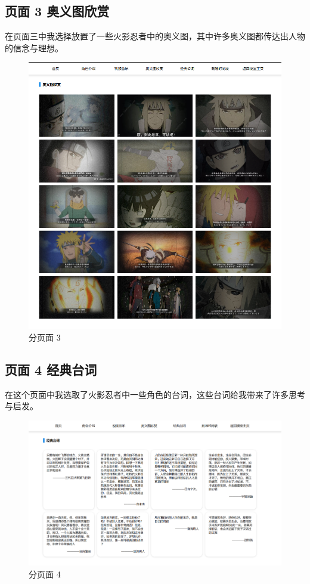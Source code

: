 \documentclass[supercite]{Experimental_Report}
\theoremstyle{definition}
\begin{document}
\newpage

\subsection{页面 3 奥义图欣赏}
在页面三中我选择放置了一些火影忍者中的奥义图，其中许多奥义图都传达出人物的信念与理想。
\begin{figure}[h]
	\centering
\includegraphics[scale=0.25]{images/2-4.png}
\caption{分页面 3}
\label{fig2-4}
\end{figure}

\newpage

\subsection{页面 4 经典台词}
在这个页面中我选取了火影忍者中一些角色的台词，这些台词给我带来了许多思考与启发。

\begin{figure}[h]
	\centering
\includegraphics[scale=0.3]{images/2-5.png}
\caption{分页面 4}
\label{fig2-5}
\end{figure}
\end{document}
